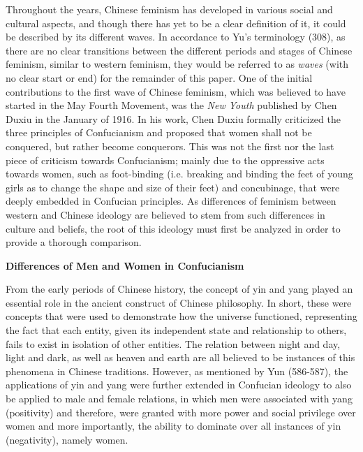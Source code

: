 \documentclass[12pt]{article}
\begin{document}
\begin{flushleft}
		Throughout the years, Chinese feminism has developed in various social and cultural aspects, and though there has yet to be a clear definition of it, it could be described by its different waves. In accordance to Yu’s terminology (308), as there are no clear transitions between the different periods and stages of Chinese feminism, similar to western feminism, they would be referred to as \textit{waves} (with no clear start or end) for the remainder of this paper. One of the initial contributions to the first wave of Chinese feminism, which was believed to have started in the May Fourth Movement, was the \textit{New Youth} published by Chen Duxiu in the January of 1916. In his work, Chen Duxiu formally criticized the three principles of Confucianism and proposed that women shall not be conquered, but rather become conquerors. This was not the first nor the last piece of criticism towards Confucianism; mainly due to the oppressive acts towards women, such as foot-binding (i.e. breaking and binding the feet of young girls as to change the shape and size of their feet) and concubinage, that were deeply embedded in Confucian principles. As differences of feminism between western and Chinese ideology are believed to stem from such differences in culture and beliefs, the root of this ideology must first be analyzed in order to provide a thorough comparison.
		
		\vspace{0.3cm}
		\noindent \textbf{Differences of Men and Women in Confucianism}
		
		\noindent From the early periods of Chinese history, the concept of yin and yang played an essential role in the ancient construct of Chinese philosophy. In short, these were concepts that were used to demonstrate how the universe functioned, representing the fact that each entity, given its independent state and relationship to others, fails to exist in isolation of other entities. The relation between night and day, light and dark, as well as heaven and earth are all believed to be instances of this phenomena in Chinese traditions. However, as mentioned by Yun (586-587), the applications of yin and yang were further extended in Confucian ideology to also be applied to male and female relations, in which men were associated with yang (positivity) and therefore, were granted with more power and social privilege over women and more importantly, the ability to dominate over all instances of yin (negativity), namely women. 
		

\end{flushleft}
\end{document}
